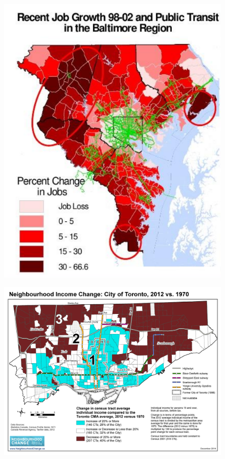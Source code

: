 \documentclass[aspectratio=169]{beamer}
\begin{document}
\begin{frame}
	
	\begin{figure}
		\centering
		\includegraphics[width=0.54\linewidth]{images/baltimore_spatial_mismatch.png}
	\end{figure}
	
\end{frame}





\begin{frame}
	
	\begin{figure}
		\centering
		\includegraphics[width=0.84\linewidth]{images/3cities_2012_1970.jpeg}
	\end{figure}
	
\end{frame}
\end{document}

